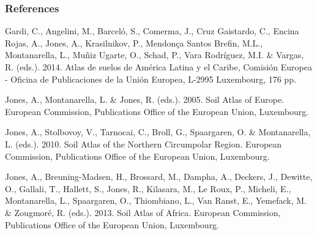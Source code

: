 \documentclass[
  letterpaper,
  DIV=11,
  numbers=noendperiod]{scrreprt}
\begin{document}
\hypertarget{references-4}{%
\subsubsection{References}\label{references-4}}

Gardi, C., Angelini, M., Barceló, S., Comerma, J., Cruz Gaistardo, C.,
Encina Rojas, A., Jones, A., Krasilnikov, P., Mendonça Santos Brefin,
M.L., Montanarella, L., Muñiz Ugarte, O., Schad, P., Vara Rodríguez,
M.I. \& Vargas, R. (eds.). 2014. Atlas de suelos de América Latina y el
Caribe, Comisión Europea - Oficina de Publicaciones de la Unión Europea,
L-2995 Luxembourg, 176 pp.

Jones, A., Montanarella, L. \& Jones, R. (eds.). 2005. Soil Atlas of
Europe. European Commission, Publications Office of the European Union,
Luxembourg.

Jones, A., Stolbovoy, V., Tarnocai, C., Broll, G., Spaargaren, O. \&
Montanarella, L. (eds.). 2010. Soil Atlas of the Northern Circumpolar
Region. European Commission, Publications Office of the European Union,
Luxembourg.

Jones, A., Breuning-Madsen, H., Brossard, M., Dampha, A., Deckers, J.,
Dewitte, O., Gallali, T., Hallett, S., Jones, R., Kilasara, M., Le Roux,
P., Micheli, E., Montanarella, L., Spaargaren, O., Thiombiano, L., Van
Ranst, E., Yemefack, M. \& Zougmoré, R. (eds.). 2013. Soil Atlas of
Africa. European Commission, Publications Office of the European Union,
Luxembourg.
\end{document}
